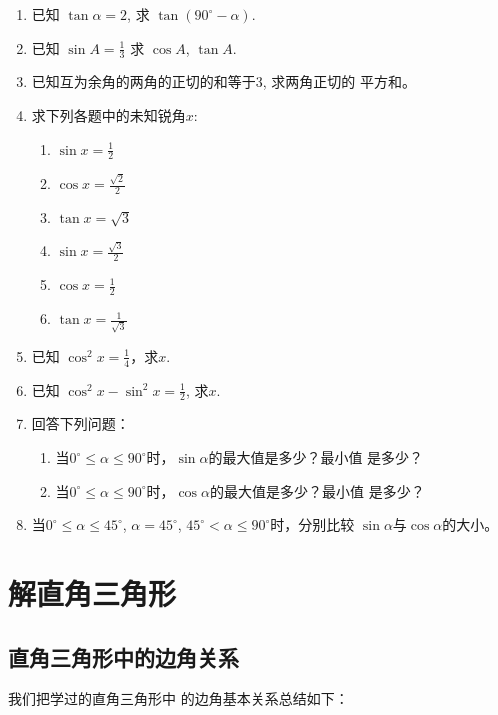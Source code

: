 \begin{enumerate}
\item 已知 $\tan \alpha =2$, 求 $\tan(90^{\circ} -\alpha )$.
\item 已知
$\sin A=\frac{1}{3}$
求 $\cos A$, $\tan A$.
\item 已知互为余角的两角的正切的和等于3, 求两角正切的
平方和。
\item 求下列各题中的未知锐角$x$:
\begin{multicols}{2}
\begin{enumerate}
    \item $\sin x=\frac{1}{2}$
    \item $\cos x=\frac{\sqrt{2}}{2}$
    \item $\tan x=\sqrt{3}$
    \item $\sin x=\frac{\sqrt{3}}{2}$
    \item $\cos x=\frac{1}{2}$
    \item $\tan x=\frac{1}{\sqrt{3}}$
\end{enumerate}
\end{multicols}

\item 已知 $\cos^2 x=\frac{1}{4}$，求$x$.
\item 已知 $\cos^2x-\sin^2x=\frac{1}{2}$, 
求$x$.
\item 回答下列问题：
\begin{enumerate}
\item 当$0^{\circ}\le \alpha\le 90^{\circ}$时，$\sin\alpha$的最大值是多少？最小值
是多少？
\item 当$0^{\circ}\le \alpha\le 90^{\circ}$时，$\cos\alpha$的最大值是多少？最小值
是多少？
\end{enumerate}


\item 当$0^{\circ}\le \alpha\le 45^{\circ}$, $\alpha=45^{\circ}$, $45^{\circ}<\alpha\le 90^{\circ}$时，分别比较
$\sin\alpha$与$\cos\alpha$的大小。
\end{enumerate}

\section{解直角三角形}
\subsection{直角三角形中的边角关系}

我们把学过的直角三角形中
的边角基本关系总结如下：
\begin{figure}[htp]
    \centering
{}
    \caption{}
\end{figure}

